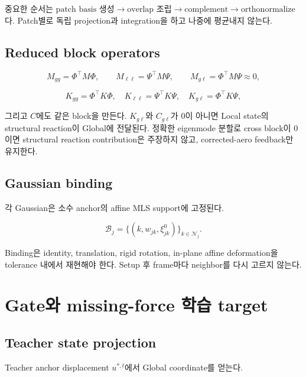 \documentclass[11pt,a4paper]{article}
\begin{document}
중요한 순서는
\(\text{patch basis 생성}\rightarrow\text{overlap 조립}\rightarrow\text{complement}\rightarrow\text{orthonormalize}\)다.
Patch별로 독립 projection과 integration을 하고 나중에 평균내지 않는다.

\subsection{Reduced block operators}

\begin{equation}
  M_{gg}=\Phi^\top M\Phi,
  \qquad
  M_{\ell\ell}=\Psi^\top M\Psi,
  \qquad
  M_{g\ell}=\Phi^\top M\Psi\approx0,
\end{equation}

\begin{equation}
  K_{gg}=\Phi^\top K\Phi,\quad
  K_{\ell\ell}=\Psi^\top K\Psi,\quad
  K_{g\ell}=\Phi^\top K\Psi,
\end{equation}

그리고 \(C\)에도 같은 block을 만든다.
\(K_{g\ell}\)와 \(C_{g\ell}\)가 0이 아니면 Local state의 structural reaction이 Global에 전달된다.
정확한 eigenmode 분할로 cross block이 0이면 structural reaction contribution은 주장하지 않고,
corrected-aero feedback만 유지한다.

\subsection{Gaussian binding}

각 Gaussian은 소수 anchor의 affine MLS support에 고정된다.

\begin{equation}
  \mathcal B_j
  =
  \{(k,w_{jk},\xi_{jk}^0)\}_{k\in\mathcal N_j}.
\end{equation}

Binding은 identity, translation, rigid rotation,
in-plane affine deformation을 tolerance 내에서 재현해야 한다.
Setup 후 frame마다 neighbor를 다시 고르지 않는다.

\section{Gate와 missing-force 학습 target}

\subsection{Teacher state projection}

Teacher anchor displacement \(u^{*,t}\)에서 Global coordinate를 얻는다.
\end{document}
